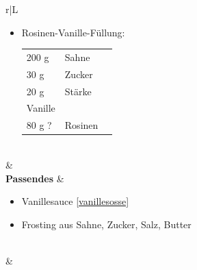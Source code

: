 \documentclass[a4paper, 12pt]{scrbook} 								%
\numberwithin{equation}{section} 									%
\begin{document}
\begin{tabularx}{\textwidth}{r|L}
\begin{itemize}[]
											\item Rosinen-Vanille-Füllung:
											
											\begin{tabular}{lll}
												200 g & Sahne \\
												30 g & Zucker \\
												20 g & Stärke \\
												Vanille  \\
												80 g ? & Rosinen
											\end{tabular}
										\end{itemize}	\\
									&	\\	
			\textbf{Passendes}		&	\begin{itemize}[]
											\item Vanillesauce \ref{vanillesosse}
											\item Frosting aus Sahne, Zucker, Salz, Butter
										\end{itemize}	\\
									&	\\
		\end{tabularx}
		
\end{document}
